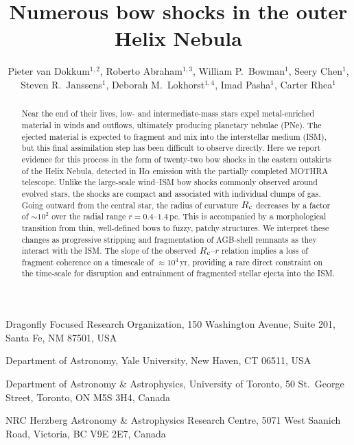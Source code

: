 \documentclass{nature_arxiv}
\title{Numerous bow shocks in the outer Helix Nebula}
\author{\large Pieter van Dokkum$^{1,2}$,
Roberto Abraham$^{1,3}$,
William P.\ Bowman$^{1}$,
Seery Chen$^{1}$,
Steven R.\ Janssens$^{1}$,
Deborah M.\ Lokhorst$^{1,4}$,
Imad Pasha$^{1}$,
Carter Rhea$^{1}$
\vspace{8pt}}
\begin{document}
\maketitle


\begin{affiliations}
\small
\item Dragonfly Focused Research Organization, 150 Washington Avenue, Suite 201, Santa Fe, NM 87501, USA
\item Department of Astronomy, Yale University, New Haven, CT 06511, USA
\item Department of Astronomy \& Astrophysics, University of Toronto,
50 St.\ George Street, Toronto, ON M5S 3H4, Canada
\item NRC Herzberg Astronomy \& Astrophysics Research Centre, 5071 West Saanich Road, Victoria, BC V9E 2E7, Canada

\end{affiliations}



\begin{abstract}

Near the end of their lives, low- and intermediate-mass stars expel metal-enriched material in winds and outflows, ultimately producing planetary nebulae (PNe).\cite{kwok78,iben83} The ejected material is expected to fragment and mix into the interstellar medium (ISM), but this final assimilation step has been difficult to observe directly.\cite{borkowski90,wareing07}
Here we report evidence for this process in the form of twenty-two bow shocks in the eastern outskirts of the Helix Nebula, detected in H$\alpha$ emission with the partially completed MOTHRA telescope.
Unlike the large-scale wind--ISM bow shocks commonly observed around evolved stars,\cite{wareing06,Martin2007,Cox2012} the shocks are compact and associated with individual clumps of gas.
Going outward from the central star, the radius of curvature $R_{\rm c}$
decreases by a factor of $\sim 10^2$ over the radial range $r=0.4$--$1.4$\,pc.
This is accompanied by a morphological transition from thin, well-defined
bows to fuzzy, patchy structures.
We interpret these changes as progressive stripping and fragmentation
of AGB-shell remnants as they interact with the ISM.
The slope of the observed $R_{\rm c}$--$r$ relation implies a loss
of fragment coherence on a timescale of $\approx 10^4$\,yr, providing a rare direct constraint on the time-scale for disruption and entrainment of fragmented stellar ejecta into the ISM.\cite{klein:94,karakas14}



\end{abstract}
\end{document}
